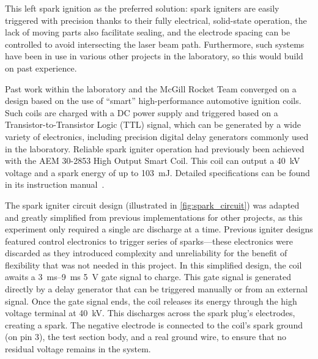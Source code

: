            This left spark ignition as the preferred solution: spark igniters are easily triggered with precision thanks to their fully electrical, solid-state operation, the lack of moving parts also facilitate sealing, and the electrode spacing can be controlled to avoid intersecting the laser beam path. Furthermore, such systems have been in use in various other projects in the laboratory, so this would build on past experience.

            Past work within the laboratory and the McGill Rocket Team converged on a design based on the use of ``smart'' high-performance automotive ignition coils. Such coils are charged with a DC power supply and triggered based on a Transistor-to-Transistor Logic (TTL) signal, which can be generated by a wide variety of electronics, including precision digital delay generators commonly used in the laboratory. Reliable spark igniter operation had previously been achieved with the AEM 30-2853 High Output Smart Coil. This coil can output a \qty{40}{kV} voltage and a spark energy of up to \qty{103}{mJ}. Detailed specifications can be found in its instruction manual~\cite{aemperformanceelectronicsInstructionManual302853}.
            
            The spark igniter circuit design (illustrated in \autoref{fig:spark_circuit}) was adapted and greatly simplified from previous implementations for other projects, as this experiment only required a single arc discharge at a time. Previous igniter designs featured control electronics to trigger series of sparks---these electronics were discarded as they introduced complexity and unreliability for the benefit of flexibility that was not needed in this project. In this simplified design, the coil awaits a \qtyrange{3}{9}{ms} 5~V gate signal to charge. This gate signal is generated directly by a delay generator that can be triggered manually or from an external signal. Once the gate signal ends, the coil releases its energy through the high voltage terminal at \qty{40}{kV}. This discharges across the spark plug's electrodes, creating a spark. The negative electrode is connected to the coil's spark ground (on pin 3), the test section body, and a real ground wire, to ensure that no residual voltage remains in the system.

